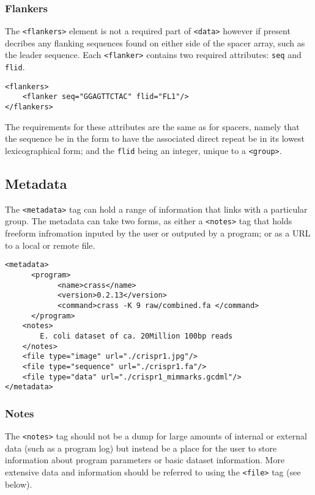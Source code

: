 \documentclass[11pt]{article} %
\begin{document}
\subsubsection{Flankers}
The \lstinline[language=XML_new]$<flankers>$ element is not a required part of \lstinline[language=XML_new]$<data>$ however if present decribes any flanking sequences found on either side of the spacer array, such as the leader sequence. Each \lstinline[language=XML_new]$<flanker>$ contains two required attributes: \lstinline[language=XML_new]$seq$ and \lstinline[language=XML_new]$flid$.
\begin{lstlisting}[language=XML_new]
<flankers>
	<flanker seq="GGAGTTCTAC" flid="FL1"/>
</flankers>
\end{lstlisting}
The requirements for these attributes are the same as for spacers, namely that the sequence be in the form to have the associated direct repeat be in its lowest lexicographical form; and the \lstinline[language=XML_new]$flid$ being an integer, unique to a \lstinline[language=XML_new]$<group>$.
\subsection{Metadata}
The \lstinline[language=XML_new]$<metadata>$ tag can hold a range of information that links with a particular group.  The metadata can take two forms, as either a \lstinline[language=XML_new]$<notes>$ tag that holds freeform infromation inputed by the user or outputed by a program; or as a URL to a local or remote file.
\begin{lstlisting}[language=XML_new]
<metadata>
      <program>
        	<name>crass</name>
        	<version>0.2.13</version>
        	<command>crass -K 9 raw/combined.fa </command>
      </program>
	<notes>
		E. coli dataset of ca. 20Million 100bp reads
	</notes>
	<file type="image" url="./crispr1.jpg"/>
	<file type="sequence" url="./crispr1.fa"/>
	<file type="data" url="./crispr1_mimmarks.gcdml"/>
</metadata>
\end{lstlisting}

\subsubsection{Notes}
The \lstinline[language=XML_new]$<notes>$ tag should not be a dump for large amounts of internal or external data (such as a program log) but instead be a place for the user to store information about program parameters or basic dataset information.  More extensive data and information should be referred to using the \lstinline[language=XML_new]$<file>$ tag (see below).
\end{document}
